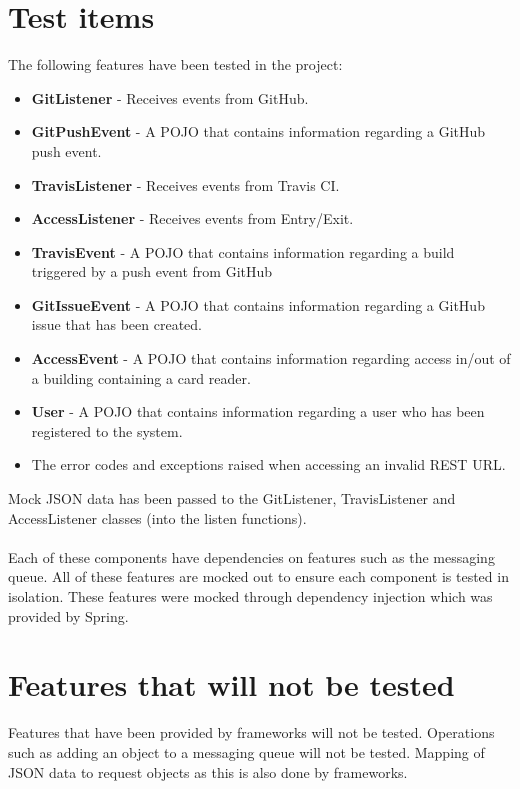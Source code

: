 \documentclass[11pt,a4paper]{article}
\begin{document}
\section{Test items}
The following features have been tested in the project:
\begin{itemize}
	\item \textbf{GitListener} - Receives events from GitHub.
	\item \textbf{GitPushEvent} - A POJO that contains information regarding a GitHub push event.
	\item \textbf{TravisListener} - Receives events from Travis CI.
	\item \textbf{AccessListener} - Receives events from Entry/Exit.
	\item \textbf{TravisEvent} - A POJO that contains information regarding a build triggered by a push event from GitHub
	\item \textbf{GitIssueEvent} - A POJO that contains information regarding a GitHub issue that has been created.
	\item \textbf{AccessEvent} - A POJO that contains information regarding access in/out of a building containing a card reader.
	\item \textbf{User} - A POJO that contains information regarding a user who has been registered to the system.
	\item The error codes and exceptions raised when accessing an invalid REST URL.
	 
\end{itemize}

Mock JSON data has been passed to the GitListener, TravisListener and AccessListener classes (into the listen functions). \\\\
Each of these components have dependencies on features such as the messaging queue. All of these features are mocked out to ensure each component is tested in isolation. These features were mocked through dependency injection which was provided by Spring. \\

\section{Features that will not be tested}

Features that have been provided by frameworks will not be tested. Operations such as adding an object to a messaging queue will not be tested. Mapping of JSON data to request objects as this is also done by frameworks.
\end{document}
